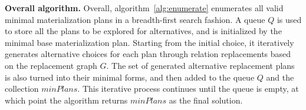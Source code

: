 \noindent \textbf{Overall algorithm.} 
Overall, algorithm~\ref{alg:enumerate} enumerates all valid minimal materialization plans in a breadth-first search fashion. 
A queue $Q$ is used to store all the plans to be explored for alternatives, and is initialized by the minimal base materialization plan.
Starting from the initial choice, it iteratively generates alternative choices for each plan through relation replacements based on the replacement graph $G$. 
The set of generated alternative replacement plans is also turned into their minimal forms, and then added to the queue $Q$ and the collection $minPlans$. 
This iterative process continues until the queue is empty, at which point the algorithm returns $minPlans$ as the final solution.